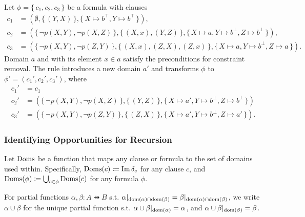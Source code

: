 \begin{example}
  Let $\phi = \{\, c_1, c_2, c_3 \,\}$ be a formula with clauses
  \begin{align*}
    c_1 &= (\emptyset, \{\, (Y, X) \,\}, \{\, X \mapsto b^\top, Y \mapsto b^\top \,\}), \\
    c_2 &= (\{\, \neg p(X, Y), \neg p(X, Z) \,\}, \{\, (X, x), (Y, Z) \,\}, \{\, X \mapsto a, Y \mapsto b^\bot, Z \mapsto b^\bot \,\}), \\
    c_3 &= (\{\, \neg p(X, Y), \neg p(Z, Y) \,\}, \{\, (X, x), (Z, X), (Z, x) \,\}, \{\, X \mapsto a, Y \mapsto b^\bot, Z \mapsto a \,\}).
  \end{align*}
  Domain $a$ and with its element $x \in a$ satisfy the preconditions for constraint removal. The rule introduces a new domain $a'$ and transforms $\phi$ to $\phi' = (c_1', c_2', c_3')$, where
  \begin{align*}
    c_1' &= c_1 \\
    c_2' &= (\{\, \neg p(X, Y), \neg p(X, Z) \,\}, \{\, (Y, Z) \,\}, \{\, X \mapsto a', Y \mapsto b^\bot, Z \mapsto b^\bot \,\}) \\
    c_3' &= (\{\, \neg p(X, Y), \neg p(Z, Y) \,\}, \{\, (Z, X) \,\}, \{\, X \mapsto a', Y \mapsto b^\bot, Z \mapsto a' \,\}).
  \end{align*}
\end{example}

\subsubsection{Identifying Opportunities for Recursion} \label{sec:ref}


Let $\operatorname{Doms}$ be a function that maps any clause or formula to the set of domains used within. Specifically, $\operatorname{Doms}(c) \coloneqq \operatorname{Im} \delta_c$ for any clause $c$, and $\operatorname{Doms}(\phi) \coloneqq \bigcup_{c \in \phi} \operatorname{Doms}(c)$ for any formula $\phi$.

For partial functions $\alpha, \beta\colon A \pfun B$ s.t. $\alpha|_{\operatorname{dom}(\alpha) \cap \operatorname{dom}(\beta)} = \beta|_{\operatorname{dom}(\alpha) \cap \operatorname{dom}(\beta)}$, we write $\alpha \cup \beta$ for the unique partial function s.t. $\alpha \cup \beta|_{\operatorname{dom}(\alpha)} = \alpha$, and $\alpha \cup \beta|_{\operatorname{dom}(\beta)} = \beta$.

